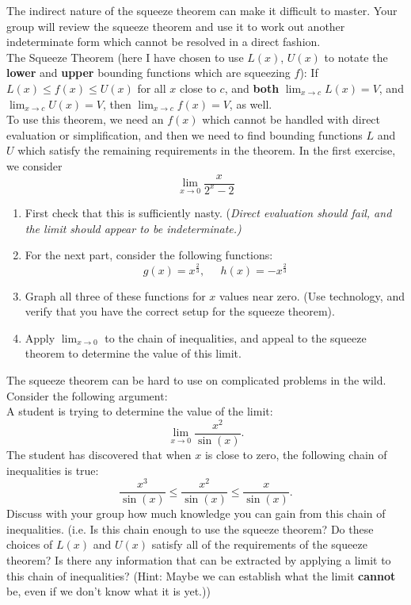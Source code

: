 \documentclass{ximera}
\begin{document}
\begin{exercise}
  The indirect nature of the squeeze theorem can make it difficult to master.  Your group will review the squeeze theorem and use it to work out another indeterminate form which cannot be resolved in a direct fashion.\\

  The Squeeze Theorem (here I have chosen to use $L(x)$, $U(x)$ to notate the \textbf{lower} and \textbf{upper} bounding functions which are squeezing $f$): If $L(x)\leq f(x)\leq U(x)$ for all $x$ close to $c$, and \textbf{both} $\displaystyle \lim_{x\rightarrow c}L(x)=V$, and $\displaystyle\lim_{x\rightarrow c}U(x)=V$, then $\displaystyle\lim_{x\rightarrow c}f(x)=V$, as well.\\

  To use this theorem, we need an $f(x)$ which cannot be handled with direct evaluation or simplification, and then we need to find bounding functions $L$ and $U$ which satisfy the remaining requirements in the theorem.
  In the first exercise, we consider $$\lim_{x\rightarrow 0}\frac{x}{2^x-2}$$
  \begin{enumerate}
    \item First check that this is sufficiently nasty. (\textit{Direct evaluation should fail, and the limit should appear to be indeterminate.)}
    \item For the next part, consider the following functions: 
    $$g(x)=x^{\frac23},\;\;\;\;\;h(x)=-x^{\frac23}$$
    \item Graph all three of  these functions for $x$ values near zero. (Use technology, and verify that you have the correct setup for the squeeze theorem).
    \item Apply $\lim_{x\rightarrow 0}$ to the chain of inequalities, and appeal to the squeeze theorem to determine the value of this limit. \\
  \end{enumerate}
\end{exercise}

\begin{exercise}
    The squeeze theorem can be hard to use on complicated problems in the wild.  Consider the following argument: \\
    A student is trying to determine the value of the limit: $$\lim_{x\rightarrow 0}\frac{x^2}{\sin(x)}.$$
    The student has discovered that when $x$ is close to zero, the following chain of inequalities is true: 
    $$\frac{x^3}{\sin(x)}\leq\frac{x^2}{\sin(x)}\leq\frac{x}{\sin(x)}.$$
    Discuss with your group how much knowledge you can gain from this chain of inequalities. (i.e. Is this chain enough to use the squeeze theorem?  Do these choices of $L(x)$ and $U(x)$ satisfy all of the requirements of the squeeze theorem?  Is there any information that can be extracted by applying a limit to this chain of inequalities? (Hint: Maybe we can establish what the limit \textbf{cannot} be, even if we don't know what it is yet.))
     
\end{exercise}
\end{document}
